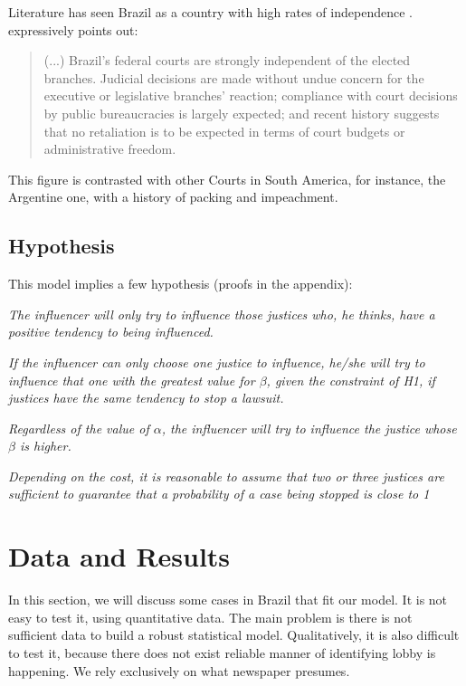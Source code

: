 \documentclass[12pt, a4paper]{article}
\newenvironment{hypothesis}
 {\enumerate[label=\textbf{H\arabic*.}, ref=H\arabic*]}
 {\endenumerate}
\begin{document}
Literature has seen Brazil 
as a country with high rates
of independence \citep{rios2006institutional, taylor2008judging}.
\citet[p. 44]{taylor2008judging} expressively points out:

\begin{quote}
    (...) Brazil's federal courts are strongly independent of
	the elected branches. Judicial decisions are made without
	undue concern for the executive or legislative branches'
	reaction; compliance with court decisions by public bureaucracies
	is largely expected; and recent history suggests that no
	retaliation is to be expected in terms of court budgets
	or administrative freedom.
\end{quote}
This figure is contrasted with other Courts in South America, 
for instance, the Argentine one, with a history of packing
and impeachment.






\subsection{Hypothesis}



This model implies a few hypothesis (proofs in the appendix): \begin{hypothesis} \item \emph{The influencer will only try to influence those justices who, he thinks, have a positive tendency to being influenced.} \item \emph{If the influencer can only choose one justice to influence, he/she will try to influence that one with the greatest value for $\beta$, given the constraint of H1, if justices have the same tendency to stop a lawsuit. } \item \emph{Regardless of the value of $\alpha$, the influencer will try to influence the justice whose $\beta$ is higher.} \item \emph{Depending on the cost, it is reasonable to assume that two or three justices are sufficient to guarantee that a probability of a case being stopped is close to 1 }  \end{hypothesis}


\section{Data and Results}

In this section, we will discuss some cases in Brazil 
that fit our model. It is not easy to test it, using 
quantitative data. The main problem is there is not 
sufficient data to build a robust statistical model. 
Qualitatively, it is also difficult to test it, because 
there does not exist reliable manner of identifying 
lobby is happening. We rely exclusively on what newspaper presumes.
\end{document}
